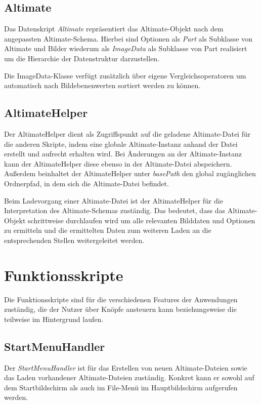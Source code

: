 \documentclass[oneside]{ausarbeitung}
\begin{document}
\subsection{Altimate}

Das Datenskript \textit{Altimate} repräsentiert das Altimate-Objekt nach dem angepassten Altimate-Schema. Hierbei sind Optionen als \textit{Part} als Subklasse von Altimate und Bilder wiederum als \textit{ImageData} als Subklasse von Part realisiert um die Hierarchie der Datenstruktur darzustellen. 

Die ImageData-Klasse verfügt zusätzlich über eigene Vergleichsoperatoren um automatisch nach Bildebenenwerten sortiert werden zu können.

\subsection{AltimateHelper}

Der AltimateHelper dient als Zugriffspunkt auf die geladene Altimate-Datei für die anderen Skripte, indem eine globale Altimate-Instanz anhand der Datei erstellt und aufrecht erhalten wird. Bei Änderungen an der Altimate-Instanz kann der AltimateHelper diese ebenso in der Altimate-Datei abspeichern. Außerdem beinhaltet der AltimateHelper unter \textit{basePath} den global zugänglichen Ordnerpfad, in dem sich die Altimate-Datei befindet.

Beim Ladevorgang einer Altimate-Datei ist der AltimateHelper für die Interpretation des Altimate-Schemas zuständig. Das bedeutet, dass das Altimate-Objekt schrittweise durchlaufen wird um alle relevanten Bilddaten und Optionen zu ermitteln und die ermittelten Daten zum weiteren Laden an die entsprechenden Stellen weitergeleitet werden. 



\section{Funktionsskripte}

Die Funktionsskripte sind für die verschiedenen Features der Anwendungen zuständig, die der Nutzer über Knöpfe ansteuern kann beziehungsweise die teilweise im Hintergrund laufen.

\subsection{StartMenuHandler}

Der \textit{StartMenuHandler} ist für das Erstellen von neuen Altimate-Dateien sowie das Laden vorhandener Altimate-Dateien zuständig. Konkret kann er sowohl auf dem Startbildschirm als auch im File-Menü im Hauptbildschirm aufgerufen werden.
\end{document}
